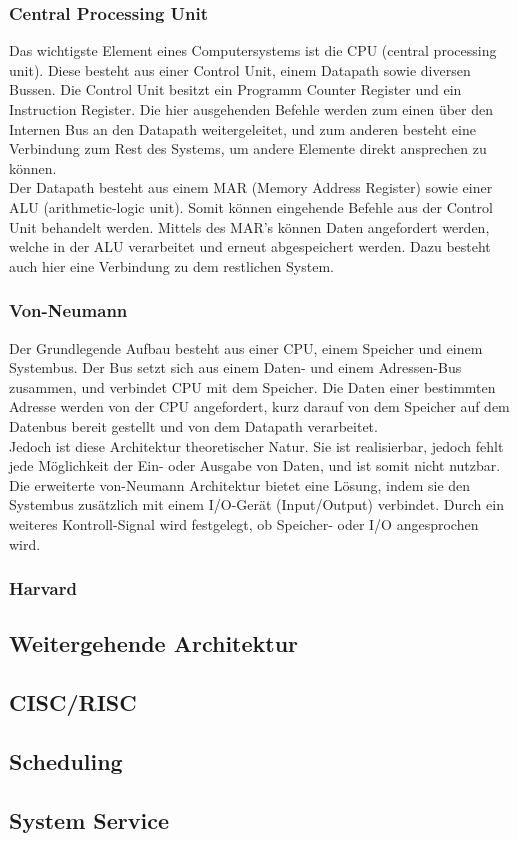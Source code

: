 \subsubsection{Central Processing Unit}
Das wichtigste Element eines Computersystems ist die CPU (central processing unit). Diese besteht aus einer Control Unit, einem Datapath sowie diversen Bussen. Die Control Unit besitzt ein Programm Counter Register und ein Instruction Register. Die hier ausgehenden Befehle werden zum einen über den Internen Bus an den Datapath weitergeleitet, und zum anderen besteht eine Verbindung zum Rest des Systems, um andere Elemente direkt ansprechen zu können.\\
Der Datapath besteht aus einem MAR (Memory Address Register) sowie einer ALU (arithmetic-logic unit). Somit können eingehende Befehle aus der Control Unit behandelt werden. Mittels des MAR's können Daten angefordert werden, welche in der ALU verarbeitet und erneut abgespeichert werden. Dazu besteht auch hier eine Verbindung zu dem restlichen System.\\

\subsubsection{Von-Neumann}
Der Grundlegende Aufbau besteht aus einer CPU, einem Speicher und einem Systembus. 
Der Bus setzt sich aus einem Daten- und einem Adressen-Bus zusammen, und verbindet CPU mit dem Speicher. Die Daten einer bestimmten Adresse werden von der CPU angefordert, kurz darauf von dem Speicher auf dem Datenbus bereit gestellt und von dem Datapath verarbeitet.\\
Jedoch ist diese Architektur theoretischer Natur. Sie ist realisierbar, jedoch fehlt jede Möglichkeit der Ein- oder Ausgabe von Daten, und ist somit nicht nutzbar.\\
Die erweiterte von-Neumann Architektur bietet eine Lösung, indem sie den Systembus zusätzlich mit einem I/O-Gerät (Input/Output) verbindet. Durch ein weiteres Kontroll-Signal wird festgelegt, ob Speicher- oder I/O angesprochen wird. 

\subsubsection{Harvard}


\subsection{Weitergehende Architektur}\label{2.4}
\subsection{CISC/RISC}\label{2.5}
\subsection{Scheduling}\label{2.6}
\subsection{System Service}\label{2.7}